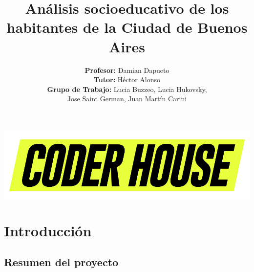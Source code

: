 \documentclass[pdf]{beamer}
\title[Curso Data Science]{\textbf{Análisis socioeducativo de los habitantes de la Ciudad de Buenos Aires}}
\author[Coderhouse]{\textbf{Profesor:} Damian Dapueto \\ \vspace{0.1cm} \textbf{Tutor:} Héctor Alonso \\ \vspace{0.1cm} \textbf{Grupo de Trabajo:} Lucia Buzzeo, Lucia Hukovsky,\\ Jose Saint German, Juan Martín Carini}
\date{}
\begin{document}
\justifying

\begin{frame}

    \begin{center}
        \includegraphics[scale=0.2]{../Informe/Imagenes/Coder2.jpg}
    \end{center}

    \titlepage

\end{frame}

\section{Introducción}

    \subsection{Resumen del proyecto}
\end{document}
